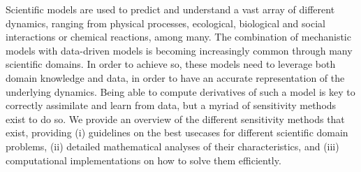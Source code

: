 Scientific models are used to predict and understand a vast array of different dynamics, ranging from physical processes, ecological, biological and social interactions or chemical reactions, among many. 
The combination of mechanistic models with data-driven models is becoming increasingly common through many scientific domains. 
In order to achieve so, these models need to leverage both domain knowledge and data, in order to have an accurate representation of the underlying dynamics. 
Being able to compute derivatives of such a model is key to correctly assimilate and learn from data, but a myriad of sensitivity methods exist to do so. 
We provide an overview of the different sensitivity methods that exist, providing (i) guidelines on the best usecases for different scientific domain problems, (ii) detailed mathematical analyses of their characteristics, and (iii) computational implementations on how to solve them efficiently. 